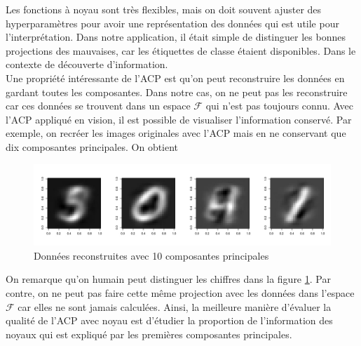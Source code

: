 Les fonctions à noyau sont très flexibles, mais on doit souvent ajuster des hyperparamètres pour avoir une représentation des données qui est utile pour l'interprétation. Dans notre application, il était simple de distinguer les bonnes projections des mauvaises, car les étiquettes de classe étaient disponibles. Dans le contexte de découverte d'information.\\

Une propriété intéressante de l'ACP est qu'on peut reconstruire les données en gardant toutes les composantes. Dans notre cas, on ne peut pas les reconstruire car ces données se trouvent dans un espace $\mathcal{F}$ qui n'est pas toujours connu. Avec l'ACP appliqué en vision, il est possible de visualiser l'information conservé. Par exemple, on recréer les images originales avec l'ACP mais en ne conservant que dix composantes principales. On obtient 

\begin{figure}[H]
	\includegraphics[width=\textwidth]{reconstruction}
	\caption{Données reconstruites avec 10 composantes principales}
	\label{fig:reconstruit}
\end{figure}

On remarque qu'on humain peut distinguer les chiffres dans la figure \ref{fig:reconstruit}. Par contre, on ne peut pas faire cette même projection avec les données dans l'espace $\mathcal{F}$ car elles ne sont jamais calculées. Ainsi, la meilleure manière d'évaluer la qualité de l'ACP avec noyau est d'étudier la proportion de l'information des noyaux qui est expliqué par les premières composantes principales. 
